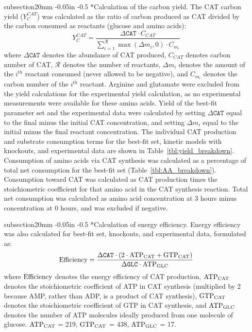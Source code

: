\documentclass[12pt]{article}
\makeatletter
\renewcommand\subsection{\@startsection
	{subsection}{2}{0mm}
	{-0.05in}
	{-0.5\baselineskip}
	{\normalfont\normalsize\bfseries}}
\makeatother
\begin{document}
\subsection*{Calculation of the carbon yield.}
The CAT carbon yield ($Y_{C}^{CAT}$) was calculated as the ratio of carbon produced as CAT divided by the carbon consumed as reactants (glucose and amino acids):
\begin{equation}\label{eqn:yield-definition}
	Y_{C}^{CAT}=\frac{\Delta\texttt{CAT}\cdot C_{CAT}}{\displaystyle\sum_{i=1}^{\mathcal{R}}\max(\Delta m_{i},0)\cdot C_{m_i}}
\end{equation}
where $\Delta\texttt{CAT}$ denotes the abundance of CAT produced, $C_{CAT}$ denotes carbon number of CAT, $\mathcal{R}$ denotes the number of reactants,
$\Delta m_{i}$ denotes the amount of the $i^{th}$ reactant consumed (never allowed to be negative), and $C_{m_i}$ denotes the carbon number of the $i^{th}$ reactant.
Arginine and glutamate were excluded from the yield calculations for the experimental yield calculation, as no experimental measurements were available for these amino acids.
Yield of the best-fit parameter set and the experimental data were calculated by setting $\Delta\texttt{CAT}$ equal to the final minus the initial CAT concentration,
and setting $\Delta m_{i}$ equal to the initial minus the final reactant concentration.
The individual CAT production and substrate consumption terms for the best-fit set, kinetic models with knockouts, and experimental data are shown in Table~\ref{tbl:yield_breakdown}.
Consumption of amino acids via CAT synthesis was calculated as a percentage of total net consumption for the best-fit set (Table~\ref{tbl:AA_breakdown}).
Consumption toward CAT was calculated as CAT production times the stoichiometric coefficient for that amino acid in the CAT synthesis reaction.
Total net consumption was calculated as amino acid concentration at 3 hours minus concentration at 0 hours, and was excluded if negative.

\subsection*{Calculation of energy efficiency.}
Energy efficiency was also calculated for best-fit set, knockouts, and experimental data, formulated as:
\begin{equation}\label{eqn:energy-efficiency-definition}
	\rm Efficiency=\frac{\Delta\texttt{CAT}\cdot \left(2\cdot\rm {ATP}_{CAT}+\rm {GTP}_{CAT}\right)}{\Delta\texttt{GLC}\cdot \rm {ATP}_{GLC}}
\end{equation}
where $\rm Efficiency$ denotes the energy efficiency of CAT production, $\rm {ATP}_{CAT}$ denotes the stoichiometric coefficient of ATP in CAT synthesis (multiplied by 2 because AMP, rather than ADP, is a product of CAT synthesis), $\rm {GTP}_{CAT}$ denotes the stoichiometric coefficient of GTP in CAT synthesis, and $\rm {ATP}_{GLC}$ denotes the number of ATP molecules ideally produced from one molecule of glucose.
$\rm {ATP}_{CAT}$ = 219, $\rm {GTP}_{CAT}$ = 438, $\rm {ATP}_{GLC}$ = 17.
\end{document}

